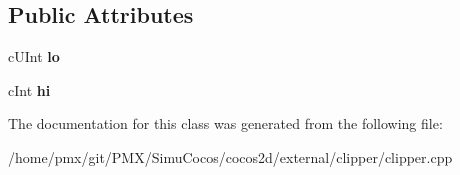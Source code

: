 \subsection*{Public Attributes}
\begin{DoxyCompactItemize}
\item 
\mbox{\label{classClipperLib_1_1Int128_a553abab34bbf6080d25e33a532926713}} 
c\+U\+Int {\bfseries lo}
\item 
\mbox{\label{classClipperLib_1_1Int128_a8e9ccd59223013a0a981c4277075d5bc}} 
c\+Int {\bfseries hi}
\end{DoxyCompactItemize}


The documentation for this class was generated from the following file\+:\begin{DoxyCompactItemize}
\item 
/home/pmx/git/\+P\+M\+X/\+Simu\+Cocos/cocos2d/external/clipper/clipper.\+cpp\end{DoxyCompactItemize}

